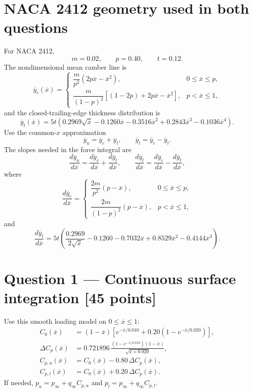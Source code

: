 \documentclass[11pt]{article}
\newcommand{\X}{\overline{x}}
\newcommand{\Yu}{\overline{y}_u}
\newcommand{\Yl}{\overline{y}_l}
\newcommand{\Yc}{\overline{y}_c}
\newcommand{\Yt}{\overline{y}_t}
\newcommand{\Cpu}{C_{p,u}}
\newcommand{\Cpl}{C_{p,l}}
\begin{document}
\section*{NACA 2412 geometry used in both questions}
For NACA 2412,
\[
m=0.02,\qquad p=0.40,\qquad t=0.12.
\]
The nondimensional mean camber line is
\begin{equation}
\Yc(\X)=
\begin{cases}
\dfrac{m}{p^2}\left(2p\X-\X^2\right), & 0\le \X\le p,\\[6pt]
\dfrac{m}{(1-p)^2}\left[(1-2p)+2p\X-\X^2\right], & p<\X\le1,
\end{cases}
\end{equation}
and the closed-trailing-edge thickness distribution is
\begin{equation}
\Yt(\X)=5t\left(0.2969\sqrt{\X}-0.1260\X-0.3516\X^2+0.2843\X^3-0.1036\X^4\right).
\end{equation}
Use the common-$x$ approximation
\begin{equation}
\Yu=\Yc+\Yt,\qquad \Yl=\Yc-\Yt.
\end{equation}
The slopes needed in the force integral are
\begin{equation}
\frac{d\Yu}{d\X}=\frac{d\Yc}{d\X}+\frac{d\Yt}{d\X},\qquad
\frac{d\Yl}{d\X}=\frac{d\Yc}{d\X}-\frac{d\Yt}{d\X},
\end{equation}
where
\begin{equation}
\frac{d\Yc}{d\X}=
\begin{cases}
\dfrac{2m}{p^2}(p-\X), & 0\le \X\le p,\\[6pt]
\dfrac{2m}{(1-p)^2}(p-\X), & p<\X\le1,
\end{cases}
\end{equation}
and
\begin{equation}
\frac{d\Yt}{d\X}=5t\left(\frac{0.2969}{2\sqrt{\X}}-0.1260-0.7032\X+0.8529\X^2-0.4144\X^3\right).
\end{equation}

\section*{Question 1 — Continuous surface integration \hfill [45 points]}
Use this smooth loading model on $0\le\X\le1$:
\begin{align}
C_0(\X) &= (1-\X)\left[e^{-\X/0.010}+0.20\left(1-e^{-\X/0.020}\right)\right],\\
\Delta C_p(\X) &= 0.721896\,\frac{\left(1-e^{-\X/0.010}\right)(1-\X)}{\sqrt{\X+0.020}},\\
\Cpu(\X) &= C_0(\X)-0.80\,\Delta C_p(\X),\\
\Cpl(\X) &= C_0(\X)+0.20\,\Delta C_p(\X).
\end{align}
If needed, $p_u=p_\infty+q_\infty\Cpu$ and $p_l=p_\infty+q_\infty\Cpl$.
\end{document}
